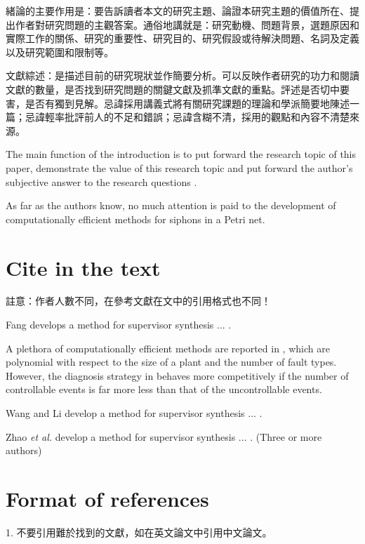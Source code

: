 
緒論的主要作用是：要告訴讀者本文的研究主題、論證本研究主題的價值所在、提出作者對研究問題的主觀答案。通俗地講就是：研究動機、問題背景，選題原因和實際工作的關係、研究的重要性、研究目的、研究假設或待解決問題、名詞及定義以及研究範圍和限制等。

文獻綜述：是描述目前的研究現狀並作簡要分析。可以反映作者研究的功力和閱讀文獻的數量，是否找到研究問題的關鍵文獻及抓準文獻的重點。評述是否切中要害，是否有獨到見解。忌諱採用講義式將有關研究課題的理論和學派簡要地陳述一篇；忌諱輕率批評前人的不足和錯誤；忌諱含糊不清，採用的觀點和內容不清楚來源。











The main function of the introduction is to put forward the research topic of this paper, demonstrate the value of this research topic and put forward the author's subjective answer to the research questions \cite{wang2019}.

As far as the authors know, no much attention is paid to the development of computationally efficient methods for siphons in a Petri net.

\section{Cite in the text}
註意：作者人數不同，在參考文獻在文中的引用格式也不同！

Fang develops a method for supervisor synthesis ... \cite{zhang2019}.

A plethora of computationally efficient methods are reported in \cite{zhang2019, wang2019}, which are polynomial with respect to the size of a plant and the number of fault types. However, the diagnosis strategy in \cite{wang2019} behaves more competitively if the number of controllable events is far more less than that of the uncontrollable events. 

Wang and Li develop a method for supervisor synthesis ... \cite{wang2019}.

Zhao {\it et al.} develop a method for supervisor synthesis ... \cite{zhaoliu2019}. (Three or more authors)

\section{Format of references}

1. 不要引用難於找到的文獻，如在英文論文中引用中文論文。

